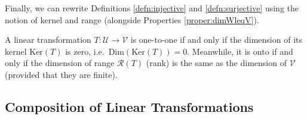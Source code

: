 Finally, we can rewrite Definitions \ref{defn:injective} and \ref{defn:surjective} using the notion of kernel and range (alongside Properties \ref{proper:dimWleqV}).
\begin{proper}
\label{proper:kerrank11onto}
A linear transformation $T: \mathcal{U} \to \mathcal{V}$ is one-to-one if and only if the dimension of its kernel $\text{Ker}(T)$ is zero, i.e.\ $\text{Dim}(\text{Ker}(T)) = 0$. Meanwhile, it is onto if and only if the dimension of range $\mathcal{R}(T)$ (rank) is the same as the dimension of $\mathcal{V}$ (provided that they are finite).
\end{proper}

\subsection{Composition of Linear Transformations}

